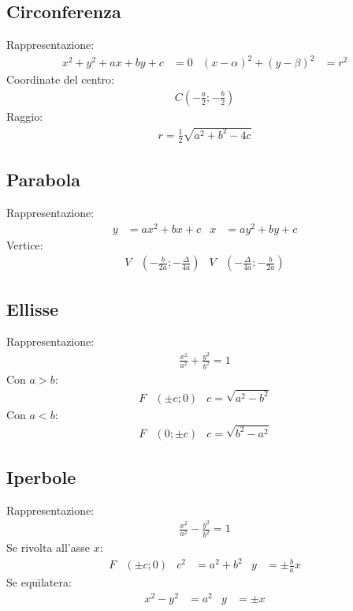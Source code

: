 \documentclass[a4paper]{article}
\begin{document}
	\subsection{Circonferenza}
	Rappresentazione:
	\begin{align*}
		x^2+y^2+ax+by+c&=0	& (x-\alpha)^2 + (y-\beta)^2 &= r^2
	\end{align*}
	Coordinate del centro:
	\begin{align*}
		C \left( -\frac{a}{2} ; -\frac{b}{2} \right)
	\end{align*}
	Raggio:
	\begin{align*}
		r = \frac{1}{2}\sqrt{a^2+b^2-4c}
	\end{align*}
	
	\subsection{Parabola}
	Rappresentazione:
	\begin{align*}
		y &= ax^2 + bx + c		&		x &= ay^2 + by + c
	\end{align*}
	Vertice:
	\begin{align*}
		V& \left(-\frac{b}{2a};-\frac{\varDelta}{4a}\right)		&		V & \left( -\frac{\varDelta}{4a} ; -\frac{b}{2a} \right) 
	\end{align*}
	
	\subsection{Ellisse}
	Rappresentazione:
	\begin{align*}
		\frac{x^2}{a^2} + \frac{y^2}{b^2} = 1
	\end{align*}
	Con $a>b$:
	\begin{align*}
		F&(\pm c ; 0)		&		c = \sqrt{a^2-b^2}
	\end{align*}
	Con $a < b$:
	\begin{align*}
		F&(0 ; \pm c)		&		c = \sqrt{b^2-a^2}
	\end{align*}
	
	\subsection{Iperbole}
	Rappresentazione:
	\begin{align*}
	\frac{x^2}{a^2} - \frac{y^2}{b^2} = 1
	\end{align*}
	Se rivolta all'asse $x$:
	\begin{align*}
		F&(\pm c ; 0)		&		c^2 &= a^2 + b^2		&		y &= \pm \frac{b}{a}x
	\end{align*}
	Se equilatera:
	\begin{align*}
		x^2 - y^2 &= a^2		&		y &= \pm x
	\end{align*}
	
\end{document}
